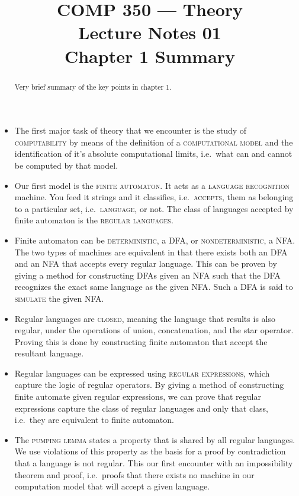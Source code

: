 \documentclass[nobib]{tufte-handout}
\title{COMP 350 --- Theory \\ Lecture Notes 01 \\ Chapter 1 Summary}
\begin{document}
\maketitle

\begin{abstract}
Very brief summary of the key points in chapter 1.
\end{abstract}

\begin{itemize}
  \item The first major task of theory that we encounter is the study of \textsc{computability} by means of the definition of a \textsc{computational model} and the identification of it's absolute computational limits, i.e.\ what can and cannot be computed by that model.

  \item Our first model is the \textsc{finite automaton}.  It acts as a \textsc{language recognition} machine. You feed it strings and it classifies, i.e.\ \textsc{accepts}, them as belonging to a particular set, i.e.\ \textsc{language}, or not. The class of languages accepted by finite automaton is the \textsc{regular languages}.

  \item Finite automaton can be \textsc{deterministic}, a DFA, or \textsc{nondeterministic}, a NFA\@. The two types of machines are equivalent in that there exists both an DFA and an NFA that accepts every regular language. This can be proven by giving a method for constructing DFAs given an NFA such that the DFA recognizes the exact same language as the given NFA\@. Such a DFA is said to \textsc{simulate} the given NFA\@.

  \item  Regular languages are \textsc{closed}, meaning the language that results is also regular, under the operations of union, concatenation, and the star operator.  Proving this is done by constructing finite automaton  that accept the resultant language.

  \item Regular languages can be expressed using \textsc{regular expressions}, which capture the logic of regular operators. By giving a method of constructing finite automate given regular expressions, we can prove that regular expressions capture the class of regular languages and only that class, i.e.\ they are equivalent to finite automaton.

  \item The \textsc{pumping lemma} states a property that is shared by all regular languages. We use violations of this property as the basis for a proof by contradiction that a language is not regular. This our first encounter with an impossibility theorem and proof, i.e.\ proofs that there exists no machine in our computation model that will accept a given language.

\end{itemize}
\end{document}
